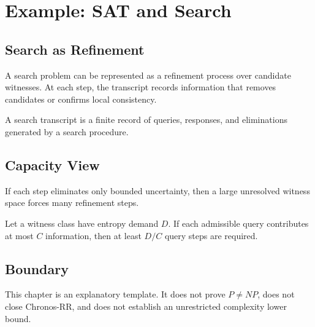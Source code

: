 \chapter{Example: SAT and Search}

\section{Search as Refinement}

A search problem can be represented as a refinement process over candidate witnesses.  At each step, the transcript records information that removes candidates or confirms local consistency.

\begin{definition}
A search transcript is a finite record of queries, responses, and eliminations generated by a search procedure.
\end{definition}

\section{Capacity View}

If each step eliminates only bounded uncertainty, then a large unresolved witness space forces many refinement steps.

\begin{example}
Let a witness class have entropy demand \(D\).  If each admissible query contributes at most \(C\) information, then at least \(D/C\) query steps are required.
\end{example}

\section{Boundary}

This chapter is an explanatory template.  It does not prove \(P \ne NP\), does not close Chronos-RR, and does not establish an unrestricted complexity lower bound.
